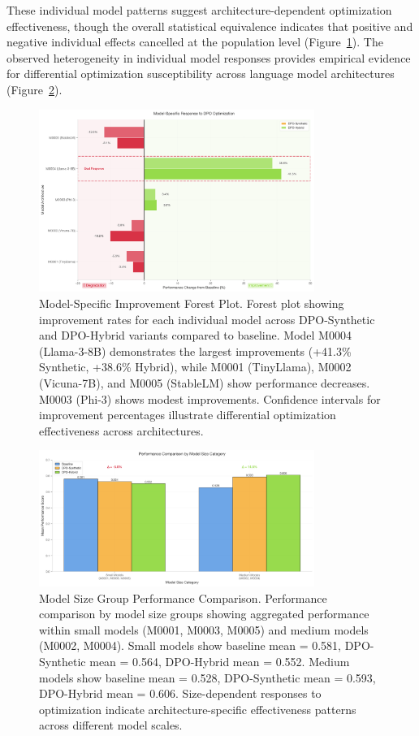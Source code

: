 These individual model patterns suggest architecture-dependent optimization effectiveness, though the overall statistical equivalence indicates that positive and negative individual effects cancelled at the population level (Figure~\ref{fig:model-improvements}). The observed heterogeneity in individual model responses provides empirical evidence for differential optimization susceptibility across language model architectures (Figure~\ref{fig:size-comparison}).

\begin{figure}[H]
\centering
\includegraphics[width=0.8\textwidth]{figures/model_specific_improvements.png}
\caption[Model-Specific Improvement Forest Plot]{Model-Specific Improvement Forest Plot. Forest plot showing improvement rates for each individual model across DPO-Synthetic and DPO-Hybrid variants compared to baseline. Model M0004 (Llama-3-8B) demonstrates the largest improvements (+41.3\% Synthetic, +38.6\% Hybrid), while M0001 (TinyLlama), M0002 (Vicuna-7B), and M0005 (StableLM) show performance decreases. M0003 (Phi-3) shows modest improvements. Confidence intervals for improvement percentages illustrate differential optimization effectiveness across architectures.}
\label{fig:model-improvements}
\end{figure}

\begin{figure}[H]
\centering
\includegraphics[width=0.8\textwidth]{figures/model_size_comparison.png}
\caption[Model Size Group Performance Comparison]{Model Size Group Performance Comparison. Performance comparison by model size groups showing aggregated performance within small models (M0001, M0003, M0005) and medium models (M0002, M0004). Small models show baseline mean = 0.581, DPO-Synthetic mean = 0.564, DPO-Hybrid mean = 0.552. Medium models show baseline mean = 0.528, DPO-Synthetic mean = 0.593, DPO-Hybrid mean = 0.606. Size-dependent responses to optimization indicate architecture-specific effectiveness patterns across different model scales.}
\label{fig:size-comparison}
\end{figure}

